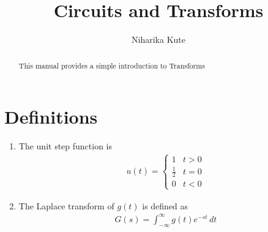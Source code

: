 \documentclass[journal,12pt,twocolumn]{IEEEtran}
\renewcommand\thesection{\arabic{section}}
\begin{document}
\let\StandardTheFigure\thefigure
\renewcommand{\thefigure}{\theproblem}
\renewcommand{\thefigure}{\arabic{section}.\arabic{figure}}
\makeatletter
{}
\makeatother


\def\putbox#1#2#3{\makebox[0in][l]{\makebox[#1][l]{}\raisebox{\baselineskip}[0in][0in]{\raisebox{#2}[0in][0in]{#3}}}}
     \def\rightbox#1{\makebox[0in][r]{#1}}
     \def\centbox#1{\makebox[0in]{#1}}
     \def\topbox#1{\raisebox{-\baselineskip}[0in][0in]{#1}}
     \def\midbox#1{\raisebox{-0.5\baselineskip}[0in][0in]{#1}}

\vspace{3cm}

\title{ 
Circuits and Transforms
}

\author{Niharika Kute}

\maketitle


\tableofcontents


\renewcommand{\thefigure}{\theenumi}
\renewcommand{\thetable}{\theenumi}



\bigskip

\begin{abstract}
This manual provides a simple introduction to Transforms
\end{abstract}

\section{Definitions}
\begin{enumerate}[label=\arabic*.,ref=\thesection.\theenumi]
\item The unit step function is 
\begin{align}
u(t) =
\begin{cases}
1 & t > 0
\\
	\frac{1}{2} & t = 0
\\
0 & t < 0
\end{cases}
\end{align}
\item The Laplace transform of $g(t)$ is defined as 
\begin{align}
	G(s) = \int_{-\infty}^{\infty} g(t) e^{-st}\, dt
\end{align}
 \end{enumerate}
\end{document}
